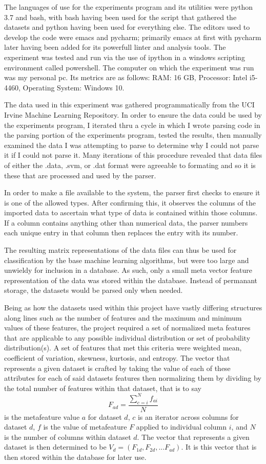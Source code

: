 The languages of use for the experiments program and its utilities were python
3.7 and bash, with bash having been used for the script that gathered the
datasets and python having been used for everything else. The editors used to
develop the code were emacs and pycharm; primarily emacs at first with pycharm
later having been added for its powerfull linter and analysis tools. The experiment
was tested and run via the use of ipython in a windows scripting environment
called powershell. The computer on which the experiment was run was my personal
pc. Its metrics are as follows: RAM: 16 GB, Processor: Intel i5-4460,
Operating System: Windows 10.

The data used in this experiment was gathered programmatically from the UCI
Irvine Machine Learning Repository. In order to ensure the data could be used
by the experiments program, I iterated thru a cycle in which I wrote
parsing code in the parsing portion of the experiments program, tested the
results, then manually examined the data I was attempting to parse to determine
why I could not parse it if I could not parse it. Many iterations of this
procedure revealed that data files of either the .data, .svm, or .dat format were agreeable
to formating and so it is these that are processed and used by the parser.

In order to make a file available to the system, the parser first checks to
ensure it is one of the allowed types. After confirming this, it observes the
columns of the imported data to ascertain what type of data is contained within
those columns. If a column contains anything other than numerical data,
the parser numbers each unique entry in that column then replaces the entry with
its number.

The resulting matrix representations of the data files can thus be used for
classification by the base machine learning algorithms, but were too large and
unwieldy for inclusion in a database. As such, only a small meta vector feature
representation of the data was stored within the database. Instead of permanant
storage, the datasets would be parsed only when needed.

Being as how the datasets used within this project have vastly differing
structures along lines such as the number of features and the maximum and
minimum values of these features, the project required a set of
normalized meta features that are applicable to any possible individual
distribution or set of probability distribution(s). A set of features that met
this criteria were weighted mean, coefficient of variation, skewness, kurtosis,
and entropy. The vector that represents a given dataset is crafted by taking the
value of each of these attributes for each of said datasets features then
normalizing them by dividing by the total number of features within that dataset,
that is to say
$$F_{ad} = \frac{\sum_{c=i}^{N}f_{ai}}{N}$$
is the metafeature value $a$ for dataset $d$, $c$ is an iterator across columns
for dataset $d$, $f$ is the value of metafeature $F$ applied to individual
column $i$, and $N$ is the number of columns within dataset $d$. The vector that
represents a given dataset is then determined to be
$V_d = (F_{1d}, F_{2d},...F_{ad})$. It is this vector that is then stored within
the database for later use.

